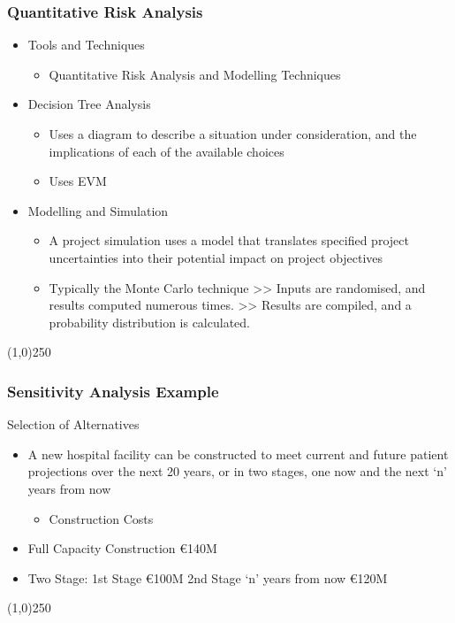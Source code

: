 \begin{frame}
\frametitle{Quantitative Risk Analysis}
\begin{itemize}
\item Tools and Techniques
\begin{itemize}
	\item Quantitative Risk Analysis and Modelling Techniques
\end{itemize}
\item Decision Tree Analysis
\begin{itemize}
	\item Uses a diagram to describe a situation under consideration, and the implications of each of the available choices
\item Uses EVM
\end{itemize}
\item Modelling and Simulation
\begin{itemize}
	\item A project simulation uses a model that translates specified project uncertainties into their potential impact on project objectives
\item Typically the Monte Carlo technique
>> Inputs are randomised, and results computed numerous times.
>> Results are compiled, and a probability distribution is calculated.
\end{itemize}
 
\end{itemize}
\end{frame}\begin{center}\line(1,0){250}\end{center}






\begin{frame}
\frametitle{Sensitivity Analysis Example}
Selection of Alternatives
\begin{itemize}
\item A new hospital facility can be constructed to meet current and future patient projections over the next 20 years, or in two stages, one now and the next `n' years from now
\begin{itemize}
	\item Construction Costs
\end{itemize}
\item Full Capacity Construction	\euro140M
\item Two Stage: 1st Stage		\euro100M
			 2nd Stage `n' years 
			 from now		\euro120M
\end{itemize}
\end{frame}\begin{center}\line(1,0){250}\end{center}



